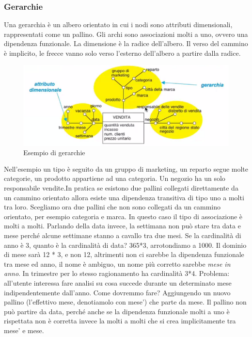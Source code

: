 \subsubsection{Gerarchie}
Una gerarchia è un albero orientato in cui i nodi sono attributi dimensionali, rappresentati come un pallino. Gli archi sono associazioni molti a uno, ovvero una dipendenza funzionale.\newline
La dimensione è la radice dell'albero.\newline 
Il verso del cammino è implicito, le frecce vanno solo verso l'esterno dell'albero a partire dalla radice.
\begin{figure}[H]
	\begin{center}
		\includegraphics[width=0.5\linewidth]{img/ger.PNG}
		\caption{Esempio di gerarchie}
	\end{center}
\end{figure}
\noindent Nell'esempio un tipo è seguito da un gruppo di marketing, un reparto segue molte categorie, un prodotto appartiene ad una categoria. Un negozio ha un solo responsabile vendite.\newline In pratica se esistono due pallini collegati direttamente da un cammino orientato allora esiste una dipendenza transitiva di tipo uno a molti tra loro.\newline
Scegliamo ora due pallini che non sono collegati da un cammino orientato, per esempio categoria e marca. In questo caso il tipo di associazione è molti a molti.\newline
Parlando della data invece, la settimana non può stare tra data e mese perché alcune settimane stanno a cavallo tra due mesi.\newline
Se la cardinalità di anno è 3, quanto è la cardinalità di data? 365*3, arrotondiamo a 1000. Il dominio di mese sarà 12 * 3, e non 12, altrimenti non ci sarebbe la dipendenza funzionale tra mese ed anno, il nome è ambiguo, un nome più corretto sarebbe \textit{mese in anno}. In trimestre per lo stesso ragionamento ha cardinalità 3*4.\newline
Problema: all'utente interessa fare analisi su cosa succede durante un determinato mese indipendentemente dall'anno. Come dovremmo fare? Aggiungendo un nuovo pallino (l'effettivo mese, denotiamolo con mese') che parte da mese. Il pallino non può partire da data, perché anche se la dipendenza funzionale molti a uno è rispettata non è corretta invece la molti a molti che si crea implicitamente tra mese' e mese.\newline\newline
